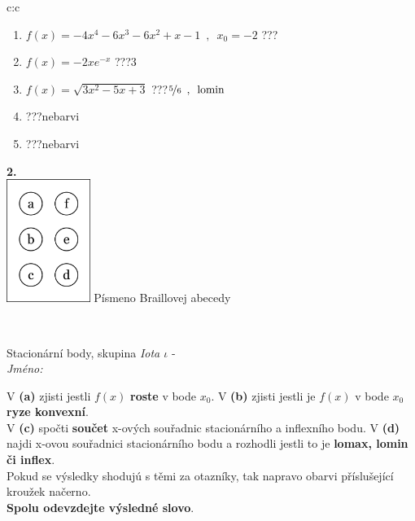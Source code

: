\documentclass[10pt]{report}
\begin{document}
\begin{tabular}{c:c}
\begin{minipage}[c][104.5mm][t]{0.5\linewidth}
\begin{center}
\begin{minipage}{0.79\linewidth}
\begin{center}
\begin{varwidth}{\linewidth}
\begin{enumerate}
\item $f(x)=-4x^4-6x^3-6x^2+x-1\enspace , \enspace x_0=-2$\quad \dotfill\; ???\;\dotfill \quad {}
\item $f(x)=-2xe^{-x}$\quad \dotfill\; ???\;\dotfill \quad $3$
\item $f(x)=\sqrt{3x^2-5x+3}$\quad \dotfill\; ???\;\dotfill \quad $\nicefrac{5}{6}\enspace , \enspace \mathrm{lomin}$
\item \quad \dotfill\; ???\;\dotfill \quad nebarvi
\item \quad \dotfill\; ???\;\dotfill \quad nebarvi
\end{enumerate}
\end{varwidth}
\end{center}
\end{minipage}
\begin{minipage}{0.20\linewidth}
\begin{center}
{\Huge\bfseries 2.} \\[2mm]
\includegraphics[height=40mm]{../images/braille.png}
{\small Písmeno Braillovej abecedy}
\end{center}
\end{minipage}
\end{center}
\end{minipage}
\\ \hdashline
\begin{minipage}[c][104.5mm][t]{0.5\linewidth}
\begin{center}
\vspace{7mm}
{\huge Stacionární body, skupina \textit{Iota $\iota$} -}\\[5mm]
\textit{Jméno:}\phantom{xxxxxxxxxxxxxxxxxxxxxxxxxxxxxxxxxxxxxxxxxxxxxxxxxxxxxxxxxxxxxxxxx}\\[5mm]
\begin{minipage}{0.95\linewidth}
\begin{center}
{\small V \textbf{(a)} zjisti jestli $f(x)$ \textbf{roste} v bode $x_0$. V \textbf{(b)} zjisti jestli je $f(x)$ v bode $x_0$ \textbf{ryze konvexní}.\\V \textbf{(c)} spočti \textbf{součet} x-ových souřadnic stacionárního a inflexního bodu. V \textbf{(d)} najdi x-ovou souřadnici stacionárního bodu a rozhodli jestli to je \textbf{lomax, lomin či inflex}.\\Pokud se výsledky shodujú s těmi za otazníky, tak napravo obarvi příslušející kroužek načerno.\\\textbf{Spolu odevzdejte výsledné slovo}}.

\end{center}
\end{minipage}
\end{center}
\end{minipage}
\end{tabular}
\end{document}
